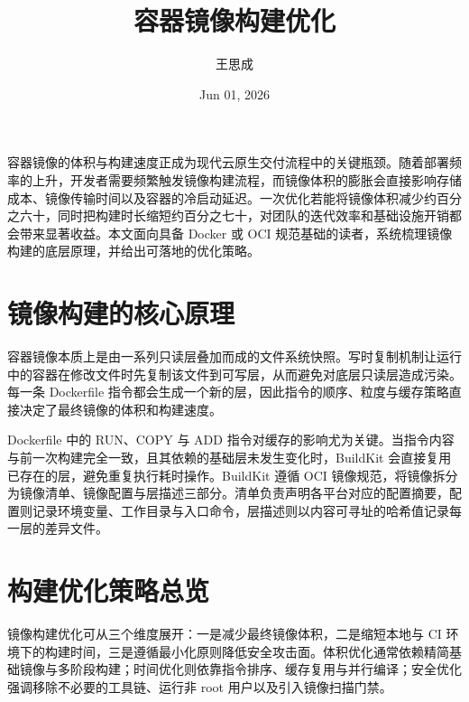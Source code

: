 \title{容器镜像构建优化}
\author{王思成}
\date{Jun 01, 2026}
\maketitle
容器镜像的体积与构建速度正成为现代云原生交付流程中的关键瓶颈。随着部署频率的上升，开发者需要频繁触发镜像构建流程，而镜像体积的膨胀会直接影响存储成本、镜像传输时间以及容器的冷启动延迟。一次优化若能将镜像体积减少约百分之六十，同时把构建时长缩短约百分之七十，对团队的迭代效率和基础设施开销都会带来显著收益。本文面向具备 Docker 或 OCI 规范基础的读者，系统梳理镜像构建的底层原理，并给出可落地的优化策略。\par
\chapter{镜像构建的核心原理}
容器镜像本质上是由一系列只读层叠加而成的文件系统快照。写时复制机制让运行中的容器在修改文件时先复制该文件到可写层，从而避免对底层只读层造成污染。每一条 Dockerfile 指令都会生成一个新的层，因此指令的顺序、粒度与缓存策略直接决定了最终镜像的体积和构建速度。\par
Dockerfile 中的 RUN、COPY 与 ADD 指令对缓存的影响尤为关键。当指令内容与前一次构建完全一致，且其依赖的基础层未发生变化时，BuildKit 会直接复用已存在的层，避免重复执行耗时操作。BuildKit 遵循 OCI 镜像规范，将镜像拆分为镜像清单、镜像配置与层描述三部分。清单负责声明各平台对应的配置摘要，配置则记录环境变量、工作目录与入口命令，层描述则以内容可寻址的哈希值记录每一层的差异文件。\par
\chapter{构建优化策略总览}
镜像构建优化可从三个维度展开：一是减少最终镜像体积，二是缩短本地与 CI 环境下的构建时间，三是遵循最小化原则降低安全攻击面。体积优化通常依赖精简基础镜像与多阶段构建；时间优化则依靠指令排序、缓存复用与并行编译；安全优化强调移除不必要的工具链、运行非 root 用户以及引入镜像扫描门禁。\par

